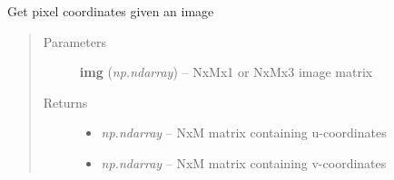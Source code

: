 \documentclass[letterpaper,10pt,english]{sphinxmanual}
\begin{document}
\begin{fulllineitems}
\label{flamingo/rectification/index:flamingo.rectification.rectification.get_pixel_coordinates}
Get pixel coordinates given an image
\begin{quote}\begin{description}
\item[{Parameters}] \leavevmode
\textbf{img} (\emph{np.ndarray}) -- NxMx1 or NxMx3 image matrix

\item[{Returns}] \leavevmode
\begin{itemize}
\item {} 
\emph{np.ndarray} --
NxM matrix containing u-coordinates

\item {} 
\emph{np.ndarray} --
NxM matrix containing v-coordinates

\end{itemize}


\end{description}\end{quote}

\end{fulllineitems}

\end{document}
